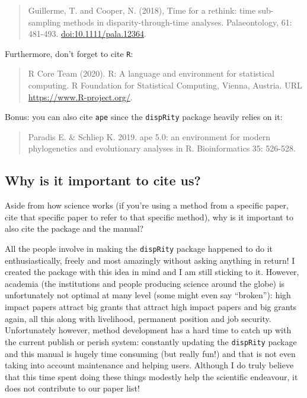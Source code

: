 \documentclass[
]{book}
\begin{document}
\begin{quote}
Guillerme, T. and Cooper, N. (2018), Time for a rethink: time sub-sampling methods in disparity-through-time analyses. Palaeontology, 61: 481-493. \href{https://onlinelibrary.wiley.com/doi/abs/10.1111/pala.12364}{doi:10.1111/pala.12364}.
\end{quote}

Furthermore, don't forget to cite \texttt{R}:

\begin{quote}
R Core Team (2020). R: A language and environment for statistical computing. R Foundation for Statistical Computing, Vienna, Austria. URL \url{https://www.R-project.org/}.
\end{quote}

Bonus: you can also cite \texttt{ape} since the \texttt{dispRity} package heavily relies on it:

\begin{quote}
Paradis E. \& Schliep K. 2019. ape 5.0: an environment for modern phylogenetics and evolutionary analyses in R. Bioinformatics 35: 526-528.
\end{quote}

\hypertarget{why-is-it-important-to-cite-us}{%
\subsection{Why is it important to cite us?}\label{why-is-it-important-to-cite-us}}

Aside from how science works (if you're using a method from a specific paper, cite that specific paper to refer to that specific method), why is it important to also cite the package and the manual?

All the people involve in making the \texttt{dispRity} package happened to do it enthusiastically, freely and most amazingly without asking anything in return!
I created the package with this idea in mind and I am still sticking to it.
However, academia (the institutions and people producing science around the globe) is unfortunately not optimal at many level (some might even say ``broken''): high impact papers attract big grants that attract high impact papers and big grants again, all this along with livelihood, permanent position and job security.
Unfortunately however, method development has a hard time to catch up with the current publish or perish system: constantly updating the \texttt{dispRity} package and this manual is hugely time consuming (but really fun!) and that is not even taking into account maintenance and helping users.
Although I do truly believe that this time spent doing these things modestly help the scientific endeavour, it does not contribute to our paper list!
\end{document}
